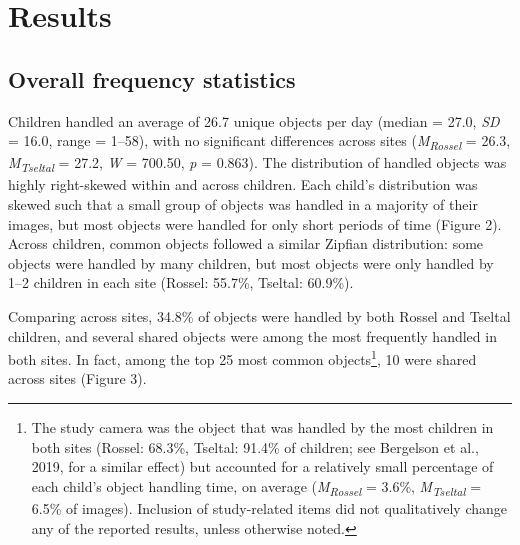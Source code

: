 \documentclass[10pt, letterpaper]{article}
\begin{document}
\hypertarget{results}{%
\section{Results}\label{results}}

\hypertarget{overall-frequency-statistics}{%
\subsection{Overall frequency
statistics}\label{overall-frequency-statistics}}

Children handled an average of 26.7 unique objects per day (median =
27.0, \emph{SD} = 16.0, range = 1--58), with no significant differences
across sites (\emph{M}\textsubscript{\emph{Rossel}} = 26.3,
\emph{M}\textsubscript{\emph{Tseltal}} = 27.2, \emph{W} = 700.50,
\emph{p} = 0.863). The distribution of handled objects was highly
right-skewed within and across children. Each child's distribution was
skewed such that a small group of objects was handled in a majority of
their images, but most objects were handled for only short periods of
time (Figure 2). Across children, common objects followed a similar
Zipfian distribution: some objects were handled by many children, but
most objects were only handled by 1--2 children in each site (Rossel:
55.7\%, Tseltal: 60.9\%).

Comparing across sites, 34.8\% of objects were handled by both Rossel
and Tseltal children, and several shared objects were among the most
frequently handled in both sites. In fact, among the top 25 most common
objects\footnote{The study camera was the object that was handled by the
  most children in both sites (Rossel: 68.3\%, Tseltal: 91.4\% of
  children; see Bergelson et al., 2019, for a similar effect) but
  accounted for a relatively small percentage of each child's object
  handling time, on average (\emph{M}\textsubscript{\emph{Rossel}} =
  3.6\%, \emph{M}\textsubscript{\emph{Tseltal}} = 6.5\% of images).
  Inclusion of study-related items did not qualitatively change any of
  the reported results, unless otherwise noted.}, 10 were shared across
sites (Figure 3).
\end{document}
